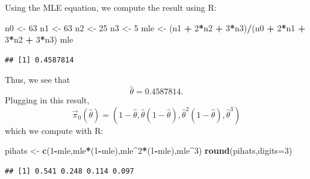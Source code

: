 \documentclass[
]{article}
\newenvironment{Shaded}{\begin{snugshade}}{\end{snugshade}}
\newcommand{\AttributeTok}[1]{\textcolor[rgb]{0.13,0.29,0.53}{#1}}
\newcommand{\DecValTok}[1]{\textcolor[rgb]{0.00,0.00,0.81}{#1}}
\newcommand{\FunctionTok}[1]{\textcolor[rgb]{0.13,0.29,0.53}{\textbf{#1}}}
\newcommand{\NormalTok}[1]{#1}
\newcommand{\OtherTok}[1]{\textcolor[rgb]{0.56,0.35,0.01}{#1}}
\newcommand{\SpecialCharTok}[1]{\textcolor[rgb]{0.81,0.36,0.00}{\textbf{#1}}}
\begin{document}

Using the MLE equation, we compute the result using R:

\begin{Shaded}
\begin{Highlighting}[]
\NormalTok{n0 }\OtherTok{\textless{}{-}} \DecValTok{63}
\NormalTok{n1 }\OtherTok{\textless{}{-}} \DecValTok{63}
\NormalTok{n2 }\OtherTok{\textless{}{-}} \DecValTok{25}
\NormalTok{n3 }\OtherTok{\textless{}{-}} \DecValTok{5}
\NormalTok{mle }\OtherTok{\textless{}{-}}\NormalTok{ (n1 }\SpecialCharTok{+} \DecValTok{2}\SpecialCharTok{*}\NormalTok{n2 }\SpecialCharTok{+} \DecValTok{3}\SpecialCharTok{*}\NormalTok{n3)}\SpecialCharTok{/}\NormalTok{(n0 }\SpecialCharTok{+} \DecValTok{2}\SpecialCharTok{*}\NormalTok{n1 }\SpecialCharTok{+} \DecValTok{3}\SpecialCharTok{*}\NormalTok{n2 }\SpecialCharTok{+} \DecValTok{3}\SpecialCharTok{*}\NormalTok{n3)}
\NormalTok{mle}
\end{Highlighting}
\end{Shaded}

\begin{verbatim}
## [1] 0.4587814
\end{verbatim}

Thus, we see that \[
  \hat\theta = 0.4587814.
\] Plugging in this result, \[
  \vec{\pi}_{0}(\hat\theta) = (1-\hat\theta,\hat\theta(1-\hat\theta),
        \hat\theta^2(1-\hat\theta),\hat\theta^3)
\] which we compute with R:

\begin{Shaded}
\begin{Highlighting}[]
\NormalTok{pihats }\OtherTok{\textless{}{-}} \FunctionTok{c}\NormalTok{(}\DecValTok{1}\SpecialCharTok{{-}}\NormalTok{mle,mle}\SpecialCharTok{*}\NormalTok{(}\DecValTok{1}\SpecialCharTok{{-}}\NormalTok{mle),mle}\SpecialCharTok{\^{}}\DecValTok{2}\SpecialCharTok{*}\NormalTok{(}\DecValTok{1}\SpecialCharTok{{-}}\NormalTok{mle),mle}\SpecialCharTok{\^{}}\DecValTok{3}\NormalTok{)}
\FunctionTok{round}\NormalTok{(pihats,}\AttributeTok{digits=}\DecValTok{3}\NormalTok{)}
\end{Highlighting}
\end{Shaded}

\begin{verbatim}
## [1] 0.541 0.248 0.114 0.097
\end{verbatim}
\end{document}
